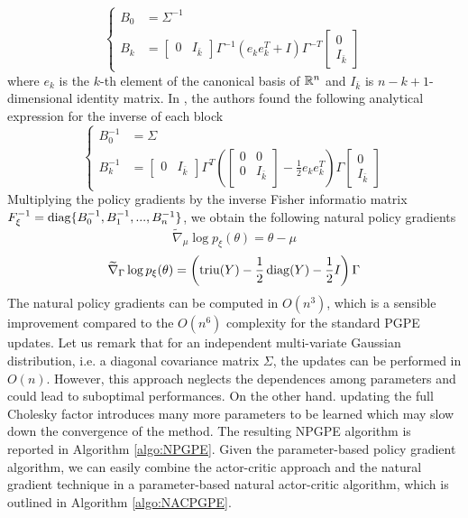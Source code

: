 \begin{equation*}
	\begin{cases}
		B_0 &= \Sigma^{-1}\\	
		B_k &= \begin{bmatrix}
				0 & I_{\bar{k}}
		\end{bmatrix} \Gamma^{-1} (e_k e_k^T + I) \Gamma^{-T} \begin{bmatrix}
						0 \\ I_{\bar{k}}
				\end{bmatrix}
	\end{cases}
\end{equation*}
where $e_k$ is the $k$-th element of the canonical basis of $\mathbb{R}^n$ and $I_{\bar{k}}$ is $n - k + 1$-dimensional identity matrix. In \cite{akimoto2010bidirectional}, the authors found the following analytical expression for the inverse of each block
\begin{equation*}
	\begin{cases}
		B_0^{-1} &= \Sigma\\	
		B_k^{-1} &= \begin{bmatrix}
				0 & I_{\bar{k}}
		\end{bmatrix} \Gamma^T \left(\begin{bmatrix}
			0 & 0 \\
			0 & I_{\bar{k}}\\
		\end{bmatrix}   -\frac{1}{2} e_k e_k^T\right) \Gamma \begin{bmatrix}
						0 \\ I_{\bar{k}}
				\end{bmatrix}
	\end{cases}
\end{equation*}
Multiplying the policy gradients by the inverse Fisher informatio matrix $F_\xi^{-1} = \operatorname{diag}\{B_0^{-1}, B_1^{-1}, ..., B_n^{-1}\}$, we obtain the following natural policy gradients
\begin{equation}
	\widetilde{\nabla}_\mu \log p_\xi(\theta) = \theta - \mu
\end{equation}
\begin{equation}
	\widetilde{\nabla}_\Gamma \log p_\xi(\theta) = \left(\operatorname{triu}(Y) - \frac{1}{2} \operatorname{diag}(Y) - \frac{1}{2} I \right) \Gamma
\end{equation}
The natural policy gradients can be computed in $O(n^3)$, which is a sensible improvement compared to the $O(n^6)$ complexity for the standard \gls{PGPE} updates. Let us remark that for an independent multi-variate Gaussian distribution, i.e. a diagonal covariance matrix $\Sigma$, the updates can be performed in $O(n)$. However, this approach neglects the dependences among parameters and could lead to suboptimal performances. On the other hand. updating the full Cholesky factor introduces many more parameters to be learned which may slow down the convergence of the method. The resulting \gls{NPGPE} algorithm is reported in Algorithm \ref{algo:NPGPE}. Given the parameter-based policy gradient algorithm, we can easily combine the actor-critic approach and the natural gradient technique in a parameter-based natural actor-critic algorithm, which is outlined in Algorithm \ref{algo:NACPGPE}.

